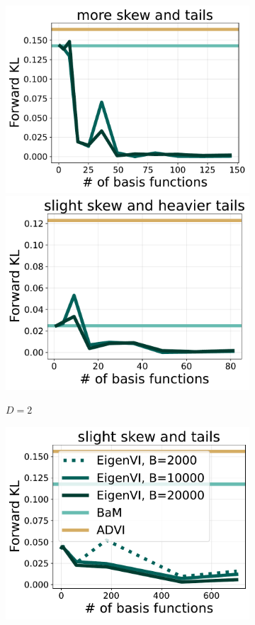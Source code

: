 \begin{figure}[t]
\begin{subfigure}[b]{\linewidth}
    \includegraphics[scale=0.21]{figs/expts-2d/sinh-2D-P2-new.pdf}
    \includegraphics[scale=0.21]{figs/expts-2d/sinh-2D-P3-new.pdf}
\caption{$D=2$}
\label{subfig:sinh2D}
    \end{subfigure}
    \begin{subfigure}[b]{\linewidth}
        \centering
    \includegraphics[scale=0.21]{figs/expts-2d/sinh-5D-P1-new.pdf}

\end{subfigure}
\end{figure}

